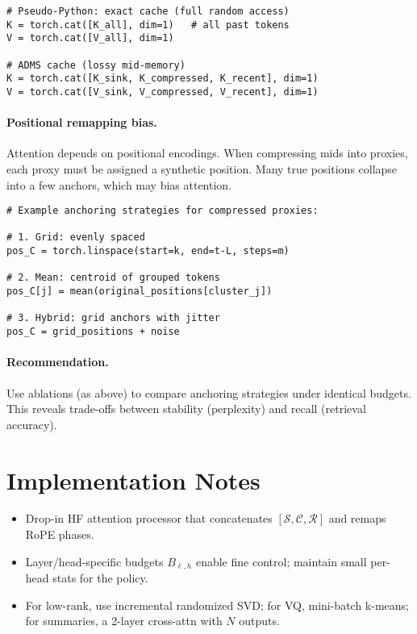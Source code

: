\documentclass[11pt]{article}
\newcommand{\sink}{\mathcal{S}}
\newcommand{\recent}{\mathcal{R}}
\newcommand{\compressed}{\mathcal{C}}
\begin{document}
\begin{verbatim}
# Pseudo-Python: exact cache (full random access)
K = torch.cat([K_all], dim=1)   # all past tokens
V = torch.cat([V_all], dim=1)

# ADMS cache (lossy mid-memory)
K = torch.cat([K_sink, K_compressed, K_recent], dim=1)
V = torch.cat([V_sink, V_compressed, V_recent], dim=1)
\end{verbatim}

\paragraph{Positional remapping bias.}
Attention depends on positional encodings. When compressing mids into proxies,
each proxy must be assigned a synthetic position. Many true positions collapse
into a few anchors, which may bias attention.

\begin{verbatim}
# Example anchoring strategies for compressed proxies:

# 1. Grid: evenly spaced
pos_C = torch.linspace(start=k, end=t-L, steps=m)

# 2. Mean: centroid of grouped tokens
pos_C[j] = mean(original_positions[cluster_j])

# 3. Hybrid: grid anchors with jitter
pos_C = grid_positions + noise
\end{verbatim}

\paragraph{Recommendation.}
Use ablations (as above) to compare anchoring strategies under identical
budgets. This reveals trade-offs between stability (perplexity) and recall
(retrieval accuracy).

\section{Implementation Notes}
\begin{itemize}
  \item Drop-in HF attention processor that concatenates $[\sink, \compressed, \recent]$ and remaps RoPE phases.
  \item Layer/head-specific budgets $B_{\ell,h}$ enable fine control; maintain small per-head stats for the policy.
  \item For low-rank, use incremental randomized SVD; for VQ, mini-batch k-means; for summaries, a 2-layer cross-attn with $N$ outputs.
\end{itemize}
\end{document}
